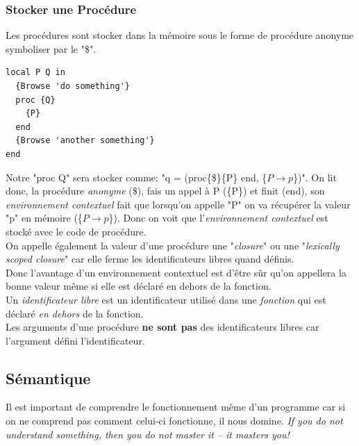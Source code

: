\documentclass{report}
\begin{document}
\subsubsection{Stocker une Procédure}
Les procédures sont stocker dans la mémoire sous le forme de procédure anonyme symboliser par le "\$".
\begin{lstlisting}
local P Q in
  {Browse 'do something'}
  proc {Q}
    {P}
  end
  {Browse 'another something'}
end
\end{lstlisting}
Notre "proc {Q}" sera stocker comme: "q = (proc\{\$\}\{P\} end, \{$P\rightarrow p$\})". On lit donc, la procédure \textit{anonyme} (\$), fais un appel à P (\{P\}) et finit (end), son \textit{environnement contextuel} fait que lorsqu'on appelle "P" on va récupérer la valeur "p" en mémoire (\{$P\rightarrow p$\}). Donc on voit que l'\textit{environnement contextuel} est stocké avec le code de procédure.\\
On appelle également la valeur d'une procédure une "\textit{closure}" ou une "\textit{lexically scoped closure}" car elle ferme les identificateurs libres quand définis.\\
Donc l'avantage d'un environnement contextuel est d'être sûr qu'on appellera la bonne valeur même si elle est déclaré en dehors de la fonction.\\

Un \textit{identificateur libre} est un identificateur utilisé dans une \textit{fonction} qui est déclaré \textit{en dehors} de la fonction.\\
Les arguments d'une procédure \textbf{ne sont pas} des identificateurs libres car l'argument défini l'identificateur.

\subsection{Sémantique}
Il est important de comprendre le fonctionnement même d'un programme car si on ne comprend pas comment celui-ci fonctionne, il nous domine. \textit{If you do not understand something, then you do not master it – it masters you!}
\end{document}
